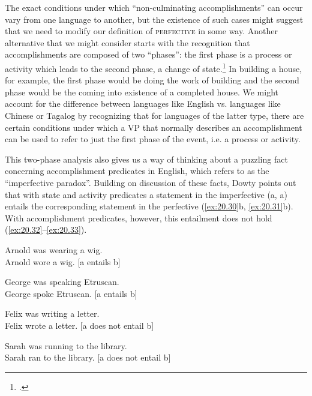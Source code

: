 The exact conditions under which “non-culminating accomplishments” can occur vary from one language to another, but the existence of such cases might suggest that we need to modify our definition of \textsc{perfective} in some way. Another alternative that we might consider starts with the recognition that accomplishments are composed of two “phases”: the first phase is a process or activity which leads to the second phase, a change of state.\footnote{\citet{KleinEtAl2000}.} In building a house, for example, the first phase would be doing the work of building and the second phase would be the coming into existence of a completed house. We might account for the difference between languages like English vs. languages like Chinese or Tagalog by recognizing that for languages of the latter type, there are certain conditions under which a VP that normally describes an accomplishment can be used to refer to just the first phase of the event, i.e. a process or activity.



This two-phase analysis also gives us a way of thinking about a puzzling fact concerning accomplishment predicates in English, which \citet{Dowty1979} refers to as the “imperfective paradox”. Building on  discussion of these facts, Dowty points out that with state and activity predicates a statement in the imperfective (a, a) entails the corresponding statement in the perfective (\ref{ex:20.30}b, \ref{ex:20.31}b). With accomplishment predicates, however, this entailment does not hold (\ref{ex:20.32}--\ref{ex:20.33}).


\ea \label{ex:20.30}
\ea  Arnold was wearing a wig.\\
\ex Arnold wore a wig. \hfill [a entails b]
                       \z
\z

\ea \label{ex:20.31}
\ea  George was speaking Etruscan.\\
\ex George spoke Etruscan. \hfill [a entails b]
                       \z
\z

\ea \label{ex:20.32}
\ea  Felix was writing a letter.\\
\ex Felix wrote a letter. \hfill [a does not entail b]
                       \z
\z

\ea \label{ex:20.33}
\ea  Sarah was running to the library.\\
\ex Sarah ran to the library. \hfill [a does not entail b]
                       \z
\z


